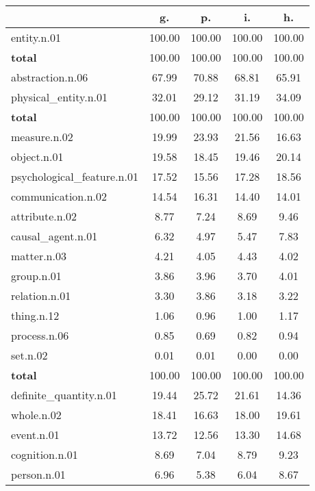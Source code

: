 \begin{table}[h!]
\begin{center}
\begin{tabular}{| l || c | c | c | c |}\hline
 & {\bf g.} & {\bf p.} & {\bf i.} & {\bf h.} \\\hline\hline
entity.n.01 & 100.00  & 100.00  & 100.00  & 100.00 \\\hline\hline
{{\bf total}} & 100.00  & 100.00  & 100.00  & 100.00 \\\hline\hline\hline
abstraction.n.06 & 67.99  & 70.88  & 68.81  & 65.91 \\\hline
physical\_entity.n.01 & 32.01  & 29.12  & 31.19  & 34.09 \\\hline\hline
{{\bf total}} & 100.00  & 100.00  & 100.00  & 100.00 \\\hline\hline\hline
measure.n.02 & 19.99  & 23.93  & 21.56  & 16.63 \\\hline
object.n.01 & 19.58  & 18.45  & 19.46  & 20.14 \\\hline
psychological\_feature.n.01 & 17.52  & 15.56  & 17.28  & 18.56 \\\hline
communication.n.02 & 14.54  & 16.31  & 14.40  & 14.01 \\\hline
attribute.n.02 & 8.77  & 7.24  & 8.69  & 9.46 \\\hline
causal\_agent.n.01 & 6.32  & 4.97  & 5.47  & 7.83 \\\hline
matter.n.03 & 4.21  & 4.05  & 4.43  & 4.02 \\\hline
group.n.01 & 3.86  & 3.96  & 3.70  & 4.01 \\\hline
relation.n.01 & 3.30  & 3.86  & 3.18  & 3.22 \\\hline
thing.n.12 & 1.06  & 0.96  & 1.00  & 1.17 \\\hline
process.n.06 & 0.85  & 0.69  & 0.82  & 0.94 \\\hline
set.n.02 & 0.01  & 0.01  & 0.00  & 0.00 \\\hline\hline
{{\bf total}} & 100.00  & 100.00  & 100.00  & 100.00 \\\hline\hline\hline
definite\_quantity.n.01 & 19.44  & 25.72  & 21.61  & 14.36 \\\hline
whole.n.02 & 18.41  & 16.63  & 18.00  & 19.61 \\\hline
event.n.01 & 13.72  & 12.56  & 13.30  & 14.68 \\\hline
cognition.n.01 & 8.69  & 7.04  & 8.79  & 9.23 \\\hline
person.n.01 & 6.96  & 5.38  & 6.04  & 8.67 \\\hline

\end{tabular}
\end{center}
\end{table}
